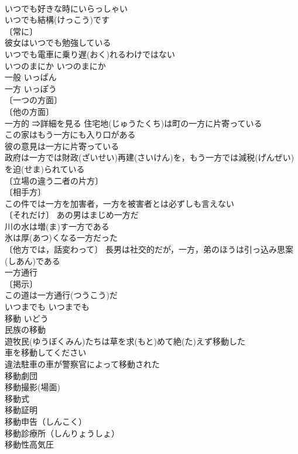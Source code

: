 \documentclass[8pt]{extreport}
\begin{document}
\begin{CJK}{UTF8}{min}
\\	いつでも好きな時にいらっしゃい 
\\	いつでも結構(けっこう)です 
\\	〔常に〕
\\	彼女はいつでも勉強している 
\\	いつでも電車に乗り遅(おく)れるわけではない 
\\	いつのまにか	いつのまにか	
\\	一般	いっぱん	
\\	一方	いっぽう	
\\	〔一つの方面〕
\\	〔他の方面〕
\\	一方的 ⇒詳細を見る 住宅地(じゅうたくち)は町の一方に片寄っている 
\\	この家はもう一方にも入り口がある 
\\	彼の意見は一方に片寄っている 
\\	政府は一方では財政(ざいせい)再建(さいけん)を，もう一方では減税(げんぜい)を迫(せま)られている 
\\	〔立場の違う二者の片方〕
\\	〔相手方〕
\\	この件では一方を加害者，一方を被害者とは必ずしも言えない 
\\	〔それだけ〕 あの男はまじめ一方だ 
\\	川の水は増(ま)す一方である 
\\	氷は厚(あつ)くなる一方だった 
\\	〔他方では，話変わって〕 長男は社交的だが，一方，弟のほうは引っ込み思案(しあん)である 
\\	一方通行 
\\	〔掲示〕
\\	この道は一方通行(つうこう)だ 
\\	いつまでも	いつまでも	
\\	移動	いどう	
\\	民族の移動 
\\	遊牧民(ゆうぼくみん)たちは草を求(もと)めて絶(た)えず移動した 
\\	車を移動してください 
\\	違法駐車の車が警察官によって移動された 
\\	移動劇団 
\\	移動撮影(場面) 
\\	移動式
\\	移動証明 
\\	移動申告（しんこく） 
\\	移動診療所（しんりょうしょ） 
\\	移動性高気圧 

\end{CJK}
\end{document}
